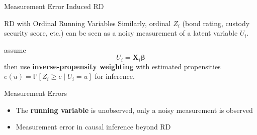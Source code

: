 \begin{frame}{Measurement Error Induced RD}
\end{frame}

\begin{frame}{RD with Ordinal Running Variables}
     Similarly, ordinal $Z_i$ {\footnotesize(bond rating, custody security score, etc.)} can be seen as a noisy measurement of a latent variable $U_i$.

     \citet{li2021regression} assume 
     $$
        U_i = \mathbf{X}_i \mathbf{\beta}
     $$
     then use \textcolor{mygreen}{\textbf{inverse-propensity weighting}} with estimated propensities $e(u)=\mathbb{P}\left[ Z_i\geq c\mid U_i=u \right]$ for inference.


\end{frame}

\begin{frame}{Measurement Errors}
    \begin{itemize}
        \item The \textcolor{mygreen}{\textbf{running variable}} is unobserved, only a noisy measurement is observed
        
        \citet{bartalotti2021correction,davezies2017regression,dong2021can,pei2017devil}
        \item Measurement error in causal inference beyond RD
        
        \citet{pearl2012measurement,kuroki2014measurement,jiang2020measurement}
    \end{itemize}
    
\end{frame}

